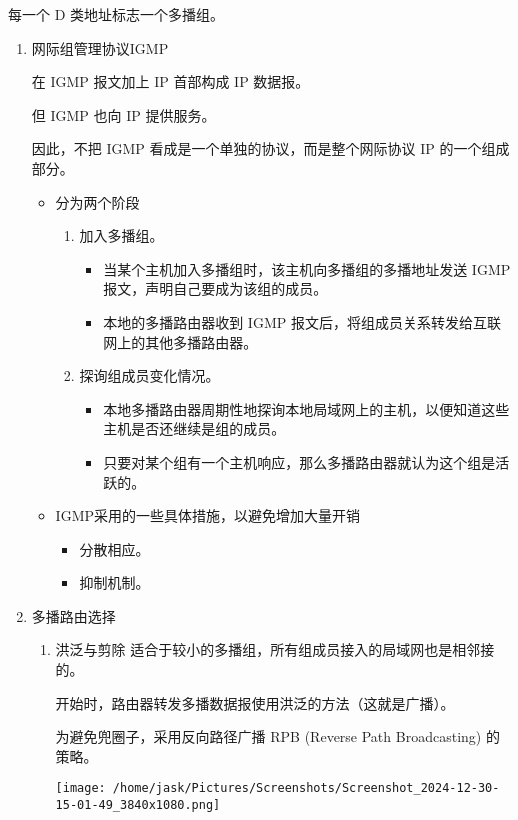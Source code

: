 \documentclass[11pt]{article}
\begin{document}
每一个 D 类地址标志一个多播组。
\begin{enumerate}
\item 网际组管理协议IGMP
\label{sec:org23f8283}

在 IGMP 报文加上 IP 首部构成 IP 数据报。

但 IGMP 也向 IP 提供服务。

因此，不把 IGMP 看成是一个单独的协议，而是整个网际协议 IP 的一个组成部分。

\begin{itemize}
\item 分为两个阶段
\begin{enumerate}
\item 加入多播组。
\begin{itemize}
\item 当某个主机加入多播组时，该主机向多播组的多播地址发送 IGMP 报文，声明自己要成为该组的成员。
\item 本地的多播路由器收到 IGMP 报文后，将组成员关系转发给互联网上的其他多播路由器。
\end{itemize}

\item 探询组成员变化情况。
\begin{itemize}
\item 本地多播路由器周期性地探询本地局域网上的主机，以便知道这些主机是否还继续是组的成员。
\item 只要对某个组有一个主机响应，那么多播路由器就认为这个组是活跃的。
\end{itemize}
\end{enumerate}

\item IGMP采用的一些具体措施，以避免增加大量开销
\begin{itemize}
\item 分散相应。

\item 抑制机制。
\end{itemize}
\end{itemize}
\item 多播路由选择
\label{sec:orgb079f8f}
\begin{enumerate}
\item 洪泛与剪除
适合于较小的多播组，所有组成员接入的局域网也是相邻接的。

开始时，路由器转发多播数据报使用洪泛的方法（这就是广播）。

为避免兜圈子，采用反向路径广播 RPB (Reverse Path Broadcasting) 的策略。
\begin{center}
\texttt{[image: /home/jask/Pictures/Screenshots/Screenshot\_2024-12-30-15-01-49\_3840x1080.png]}
\end{center}


\end{enumerate}
\end{enumerate}
\end{document}
